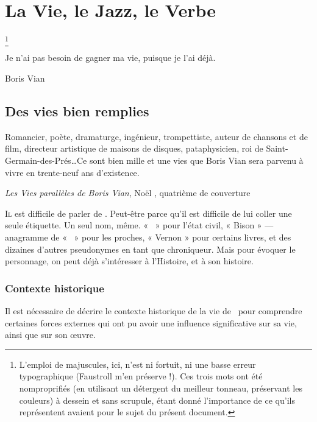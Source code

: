 \mainmatter
\chapter{La Vie, le Jazz, le Verbe}\footnote{L'emploi de majuscules, ici,
n'est ni fortuit, ni une basse erreur typographique (Faustroll m'en préserve !). Ces trois mots ont été nomproprifiés (en utilisant un détergent du
meilleur tonneau, préservant les couleurs) à dessein et sans scrupule,
étant donné l'importance de ce qu'ils représentent avaient pour le sujet du
présent document.}
\epigraph{%
Je n'ai pas besoin de gagner ma vie, puisque je l'ai déjà.}{Boris Vian}
\vfill
\pagebreak
\section{Des vies bien remplies}
\epigraph{Romancier, poète, dramaturge, ingénieur, trompettiste, auteur
de chansons et de film, directeur artistique de maisons de disques, pataphysicien, roi
de Saint-Germain-des-Prés\ldots Ce sont bien mille et une vies que Boris Vian sera parvenu
à vivre en trente-neuf ans d'existence.}
{\emph{Les Vies parallèles de Boris Vian}, Noël , quatrième de couverture}


\lettrine{I}l est difficile de parler de \BV. Peut-être parce qu'il
est difficile de lui coller une seule étiquette. Un seul nom,
même. « \BV\ » pour l'état civil, « Bison  » --- anagramme
de « \BV\ » pour les proches, « Vernon  » pour certains
livres, et des dizaines d'autres pseudonymes en tant que chroniqueur.
Mais pour évoquer le personnage, on peut déjà s'intéresser à l'Histoire,
et à son histoire.


\subsection{Contexte historique}
Il est nécessaire de décrire le contexte historique de la vie
de \BV\ pour comprendre certaines forces externes qui
ont pu avoir une influence significative sur sa vie, ainsi que
sur son  \oe{}uvre.

